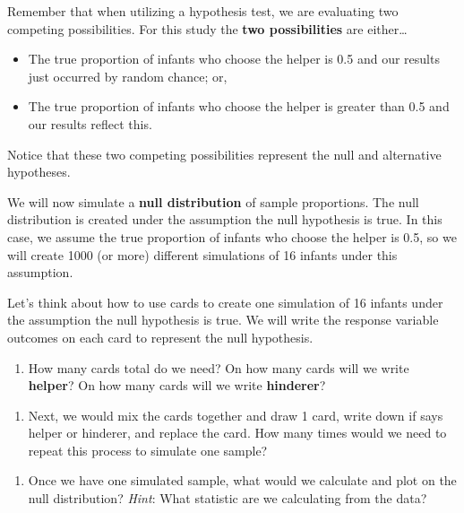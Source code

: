 \documentclass[
]{report}
\providecommand{\tightlist}{%
  \setlength{\itemsep}{0pt}\setlength{\parskip}{0pt}}
\begin{document}
\vspace{0.5in}

Remember that when utilizing a hypothesis test, we are evaluating two competing possibilities. For this study the \textbf{two possibilities} are either\ldots{}

\begin{itemize}
\item
  The true proportion of infants who choose the helper is 0.5 and our results just occurred by random chance; or,
\item
  The true proportion of infants who choose the helper is greater than 0.5 and our results reflect this.
\end{itemize}

Notice that these two competing possibilities represent the null and alternative hypotheses.

We will now simulate a \textbf{null distribution} of sample proportions. The null distribution is created under the assumption the null hypothesis is true. In this case, we assume the true proportion of infants who choose the helper is 0.5, so we will create 1000 (or more) different simulations of 16 infants under this assumption.

Let's think about how to use cards to create one simulation of 16 infants under the assumption the null hypothesis is true. We will write the response variable outcomes on each card to represent the null hypothesis.

\begin{enumerate}
\def\labelenumi{\arabic{enumi}.}
\setcounter{enumi}{13}
\tightlist
\item
  How many cards total do we need? On how many cards will we write \textbf{helper}? On how many cards will we write \textbf{hinderer}?
\end{enumerate}

\vspace{0.5in}

\begin{enumerate}
\def\labelenumi{\arabic{enumi}.}
\setcounter{enumi}{14}
\tightlist
\item
  Next, we would mix the cards together and draw 1 card, write down if says helper or hinderer, and replace the card. How many times would we need to repeat this process to simulate one sample?
\end{enumerate}

\vspace{0.5in}

\begin{enumerate}
\def\labelenumi{\arabic{enumi}.}
\setcounter{enumi}{15}
\tightlist
\item
  Once we have one simulated sample, what would we calculate and plot on the null distribution? \emph{Hint}: What statistic are we calculating from the data?
\end{enumerate}
\end{document}
